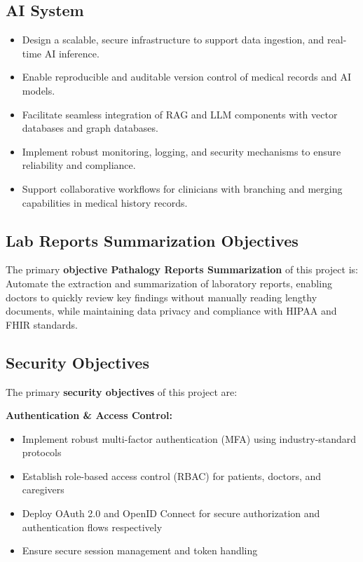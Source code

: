 \documentclass[a4paper, 12pt]{article}
\begin{document}
\subsection{AI System}
\begin{itemize}
    \item Design a scalable, secure infrastructure to support data ingestion, and real-time AI inference.
    \item Enable reproducible and auditable version control of medical records and AI models.
    \item Facilitate seamless integration of RAG and LLM components with vector databases and graph databases.
    \item Implement robust monitoring, logging, and security mechanisms to ensure reliability and compliance.
    \item Support collaborative workflows for clinicians with branching and merging capabilities in medical history records.
\end{itemize}


\subsection{Lab Reports Summarization Objectives}
The primary \textbf{objective Pathalogy Reports Summarization} of this project is:\\
Automate the extraction and summarization of laboratory reports, enabling doctors to quickly review key findings without manually reading lengthy documents, while maintaining data privacy and compliance with HIPAA and FHIR standards.

\subsection{Security Objectives}
The primary \textbf{security objectives} of this project are:

\textbf{Authentication \& Access Control:}
\begin{itemize}
    \item Implement robust multi-factor authentication (MFA) using industry-standard protocols
    \item Establish role-based access control (RBAC) for patients, doctors, and caregivers
    \item Deploy OAuth 2.0 and OpenID Connect for secure authorization and authentication flows respectively
    \item Ensure secure session management and token handling
\end{itemize}
\end{document}
